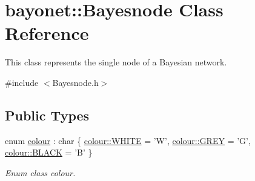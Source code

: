 \hypertarget{classbayonet_1_1_bayesnode}{\section{bayonet\-:\-:Bayesnode Class Reference}
\label{classbayonet_1_1_bayesnode}
}


This class represents the single node of a Bayesian network.  




{\ttfamily \#include $<$Bayesnode.\-h$>$}

\subsection*{Public Types}
\begin{DoxyCompactItemize}
\item 
enum \hyperlink{classbayonet_1_1_bayesnode_a6294bd0f5387871bc5f39f57cc1f0fb3}{colour} \-: char \{ \hyperlink{classbayonet_1_1_bayesnode_a6294bd0f5387871bc5f39f57cc1f0fb3ab5bf627e448384cf3a4c35121ca6008d}{colour\-::\-W\-H\-I\-T\-E} = 'W', 
\hyperlink{classbayonet_1_1_bayesnode_a6294bd0f5387871bc5f39f57cc1f0fb3a3c551f0d1a06b4f852d1832daed357bf}{colour\-::\-G\-R\-E\-Y} = 'G', 
\hyperlink{classbayonet_1_1_bayesnode_a6294bd0f5387871bc5f39f57cc1f0fb3a08d0012388564e95c3b4a7407cf04965}{colour\-::\-B\-L\-A\-C\-K} = 'B'
 \}
\begin{DoxyCompactList}\small\item\em Enum class colour. \end{DoxyCompactList}\end{DoxyCompactItemize}
